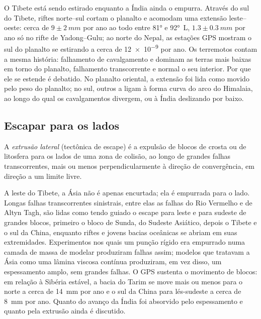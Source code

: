 O Tibete está sendo estirado enquanto a Índia ainda o empurra. Através do sul do Tibete, riftes
norte--sul cortam o planalto e acomodam uma extensão leste--oeste: cerca de $9 \pm \qty{2}{mm}$ por ano ao
todo entre \ang{81} e \ang{92}~L, $1.3 \pm \qty{0.3}{mm}$ por ano só no rifte de Yadong--Gulu;
ao norte do Nepal, as estações GPS mostram o sul do planalto se estirando a cerca de
\num{12e-9} por ano. Os terremotos contam a mesma história: falhamento de cavalgamento e 
dominam as terras mais baixas em torno do planalto, falhamento transcorrente e normal o seu interior.
Por que ele se estende é debatido. No planalto oriental, a extensão foi lida como  movido pelo peso do planalto; no sul, outros a ligam à forma curva
do arco do Himalaia, ao longo do qual os cavalgamentos divergem, ou à Índia deslizando por baixo.

\subsection{Escapar para os lados}

\begin{definition}\label{def:b2:himalaya-andes:extrusion}
A \emph{extrusão lateral} (tectônica de escape) é a expulsão de
blocos de crosta ou de litosfera para os lados de uma zona de colisão, ao longo de grandes falhas transcorrentes,
mais ou menos perpendicularmente à direção de convergência, em direção a um limite livre.
\end{definition}

A leste do Tibete, a Ásia não é apenas encurtada; ela é empurrada para o lado. Longas falhas transcorrentes
sinistrais, entre elas as falhas do Rio Vermelho e de Altyn Tagh, são lidas como tendo guiado o
escape para leste e para sudeste de grandes blocos, primeiro o bloco de Sunda, do Sudeste Asiático,
depois o Tibete e o sul da China, enquanto riftes e jovens bacias oceânicas se abriam em suas extremidades.
Experimentos nos quais um punção rígido era empurrado numa camada de massa de modelar produziram falhas assim;
modelos que tratavam a Ásia como uma lâmina viscosa contínua produziram, em vez disso, um espessamento amplo, sem
grandes falhas. O GPS sustenta o movimento de blocos: em relação à Sibéria estável, a bacia do Tarim
se move mais ou menos para o norte a cerca de \qty{14}{mm} por ano e o sul da China para lés-sudeste
a cerca de \qty{8}{mm} por ano. Quanto do avanço da Índia foi absorvido pelo espessamento e quanto
pela extrusão ainda é discutido.

